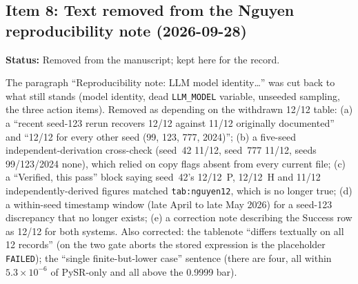 \documentclass[11pt]{article}
\begin{document}
\subsection*{Item 8: Text removed from the Nguyen reproducibility note (2026-09-28)}
\textbf{Status:} Removed from the manuscript; kept here for the record.

The paragraph ``Reproducibility note: LLM model identity\ldots'' was cut back to what still
stands (model identity, dead \texttt{LLM\_MODEL} variable, unseeded sampling, the three action
items). Removed as depending on the withdrawn 12/12 table: (a) a ``recent seed-123 rerun recovers
12/12 against 11/12 originally documented'' and ``12/12 for every other seed (99, 123, 777,
2024)''; (b) a five-seed independent-derivation cross-check (seed~42 11/12, seed~777 11/12, seeds
99/123/2024 none), which relied on copy flags absent from every current file; (c) a ``Verified, this
pass'' block saying seed~42's 12/12~P, 12/12~H and 11/12 independently-derived figures matched
\texttt{tab:nguyen12}, which is no longer true; (d) a within-seed timestamp window (late April to late May
2026) for a seed-123 discrepancy that no longer exists; (e) a correction note describing the Success row as
12/12 for both systems. Also corrected: the tablenote ``differs textually on all 12 records'' (on the two
gate aborts the stored expression is the placeholder \texttt{FAILED}); the ``single finite-but-lower case'' sentence
(there are four, all within $5.3\times10^{-6}$ of PySR-only and all above the 0.9999 bar).
\end{document}
